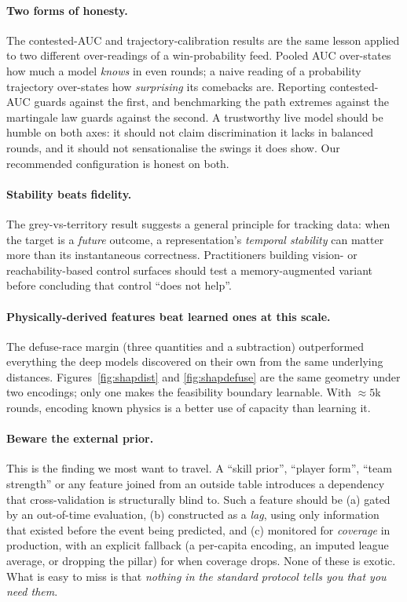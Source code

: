 \documentclass[11pt,a4paper]{article}
\begin{document}
\paragraph{Two forms of honesty.}
The contested-AUC and trajectory-calibration results are the same lesson applied to two different
over-readings of a win-probability feed. Pooled AUC over-states how much a model \emph{knows} in even
rounds; a naive reading of a probability trajectory over-states how \emph{surprising} its comebacks
are. Reporting contested-AUC guards against the first, and benchmarking the path extremes against the
martingale law guards against the second. A trustworthy live model should be humble on both axes: it
should not claim discrimination it lacks in balanced rounds, and it should not sensationalise the
swings it does show. Our recommended configuration is honest on both.

\paragraph{Stability beats fidelity.}
The grey-vs-territory result suggests a general principle for tracking data: when the target is a
\emph{future} outcome, a representation's \emph{temporal stability} can matter more than its
instantaneous correctness. Practitioners building vision- or reachability-based control surfaces
should test a memory-augmented variant before concluding that control ``does not help''.

\paragraph{Physically-derived features beat learned ones at this scale.}
The defuse-race margin (three quantities and a subtraction) outperformed everything the deep
models discovered on their own from the same underlying distances. Figures~\ref{fig:shapdist} and
\ref{fig:shapdefuse} are the same geometry under two encodings; only one makes the feasibility
boundary learnable. With $\approx 5$k rounds, encoding known physics is a better use of capacity
than learning it.

\paragraph{Beware the external prior.}
This is the finding we most want to travel. A ``skill prior'', ``player form'', ``team strength''
or any feature joined from an outside table introduces a dependency that cross-validation is
structurally blind to. Such a feature should be (a) gated by an out-of-time evaluation,
(b) constructed as a \emph{lag}, using only information that existed before the event being
predicted, and (c) monitored for \emph{coverage} in production, with an explicit fallback (a
per-capita encoding, an imputed league average, or dropping the pillar) for when coverage drops.
None of these is exotic. What is easy to miss is that \emph{nothing in the standard protocol tells
you that you need them}.
\end{document}
